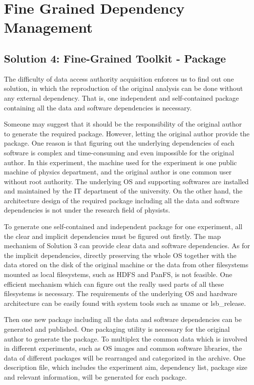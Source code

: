 \documentclass{sig-alternate}
\begin{document}
\section{Fine Grained Dependency Management}

\subsection{Solution 4: Fine-Grained Toolkit - Package}
The difficulty of data access authority acquisition enforces us to find out one
solution, in which the reproduction of the original analysis can be done
without any external dependency. That is, one independent and self-contained
package containing all the data and software dependencies is necessary. 

Someone may suggest that it should be the responsibility of the original author
to generate the required package. However, letting the original author provide
the package. 
One reason is that figuring out the underlying dependencies of
each software is complex and time-consuming and even impossible for the
original author. In this experiment, the machine used for the experiment is one
public machine of physics department, and the original author is one common user without
root authority. The underlying OS and supporting softwares are installed and
maintained by the IT department of the university. On the other hand, the
architecture design of the required package including all the data and software
dependencies is not under the research field of physists.

To generate one self-contained and independent package for one experiment, all
the clear and implicit dependencies must be figured out firstly. The map mechanism
of Solution 3 can provide clear data and software dependencies. As for the
implicit dependencies, directly preserving the whole OS together with the data
stored on the disk of the original machine or the data from other filesystems
mounted as local filesystems, such as HDFS and PanFS, is not feasible. One
efficient mechanism which can figure out the really used parts of all these
filesystems is necessary. The requirements of the underlying OS and hardware
architecture can be easily found with system tools such as uname or
lsb\_release.

Then one new package including all the data and software dependencies can be generated and published. 
One packaging utility is necessary for the original author to generate the package. 
To multiplex the common data which is involved in different experiments, such as OS images and common software libraries, the data of different packages will be rearranged and categorized in the archive.
One description file, which includes the experiment aim, dependency list,  package size and relevant information, will be generated for each package.
\end{document}
